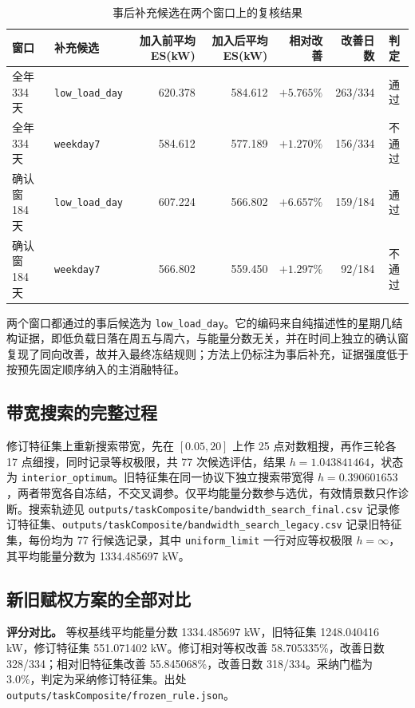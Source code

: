 \begin{appendices}
\begin{table}[htbp]
  \centering
  \footnotesize
  \caption{事后补充候选在两个窗口上的复核结果}
  \label{tab:appendix-supplementary}
  \begin{tabularx}{\textwidth}{@{}L L R R R R c@{}}
    \toprule
    窗口 & 补充候选 & 加入前平均 ES(kW) & 加入后平均 ES(kW) & 相对改善 & 改善日数 & 判定 \\
    \midrule
    全年 334 天 & \texttt{low\_load\_day} & 620.378 & 584.612 & $+5.765\%$ & 263/334 & 通过 \\
    全年 334 天 & \texttt{weekday7} & 584.612 & 577.189 & $+1.270\%$ & 156/334 & 不通过 \\
    确认窗 184 天 & \texttt{low\_load\_day} & 607.224 & 566.802 & $+6.657\%$ & 159/184 & 通过 \\
    确认窗 184 天 & \texttt{weekday7} & 566.802 & 559.450 & $+1.297\%$ & 92/184 & 不通过 \\
    \bottomrule
  \end{tabularx}
\end{table}

两个窗口都通过的事后候选为 \texttt{low\_load\_day}。它的编码来自纯描述性的星期几结构证据，即低负载日落在周五与周六，与能量分数无关，并在时间上独立的确认窗复现了同向改善，故并入最终冻结规则；方法上仍标注为事后补充，证据强度低于按预先固定顺序纳入的主消融特征。

\subsection{带宽搜索的完整过程}

修订特征集上重新搜索带宽，先在 $[0.05,20]$ 上作 25 点对数粗搜，再作三轮各 17 点细搜，同时记录等权极限，共 77 次候选评估，结果 $h=1.043841464$，状态为 \texttt{interior\_optimum}。旧特征集在同一协议下独立搜索带宽得 $h=0.390601653$，两者带宽各自冻结，不交叉调参。仅平均能量分数参与选优，有效情景数只作诊断。搜索轨迹见 \texttt{outputs/\allowbreak taskComposite/\allowbreak bandwidth\_search\_final.csv} 记录修订特征集、\texttt{outputs/\allowbreak taskComposite/\allowbreak bandwidth\_search\_legacy.csv} 记录旧特征集，每份均为 77 行候选记录，其中 \texttt{uniform\_limit} 一行对应等权极限 $h=\infty$，其平均能量分数为 1334.485697 kW。

\subsection{新旧赋权方案的全部对比}

\textbf{评分对比。} 等权基线平均能量分数 1334.485697 kW，旧特征集 1248.040416 kW，修订特征集 551.071402 kW。修订相对等权改善 58.705335\%，改善日数 328/334；相对旧特征集改善 55.845068\%，改善日数 318/334。采纳门槛为 3.0\%，判定为采纳修订特征集。出处 \texttt{outputs/\allowbreak taskComposite/\allowbreak frozen\_rule.json}。


\end{appendices}
